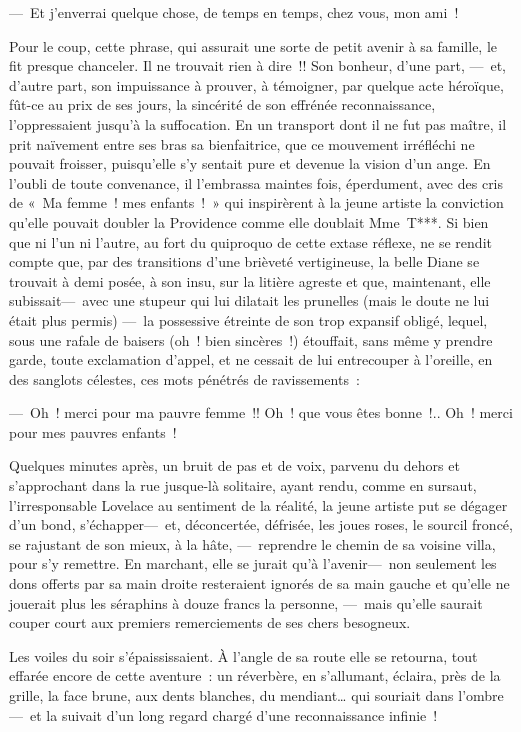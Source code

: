 \documentclass[french,twoside]{book} %
\begin{document}
— Et j’enverrai quelque chose, de temps en temps, chez vous, mon ami !\par
Pour le coup, cette phrase, qui assurait une sorte de petit avenir à sa famille, le fit presque chanceler. Il ne trouvait rien à dire !! Son bonheur, d’une part, — et, d’autre part, son impuissance   à prouver, à témoigner, par quelque acte héroïque, fût-ce au prix de ses jours, la sincérité de son effrénée reconnaissance, l’oppressaient jusqu’à la suffocation. En un transport dont il ne fut pas maître, il prit naïvement entre ses bras sa bienfaitrice, que ce mouvement irréfléchi ne pouvait froisser, puisqu’elle s’y sentait pure et devenue la vision d’un ange. En l’oubli de toute convenance, il l’embrassa maintes fois, éperdument, avec des cris de « Ma femme ! mes enfants ! » qui inspirèrent à la jeune artiste la conviction qu’elle pouvait doubler la Providence comme elle doublait Mme T***. Si bien que ni l’un ni l’autre, au fort du quiproquo de cette extase réflexe, ne se rendit compte que, par des transitions d’une brièveté vertigineuse, la belle Diane se trouvait à demi posée, à son insu, sur la litière agreste et que, maintenant, elle subissait— avec une stupeur qui lui dilatait les prunelles (mais le doute ne lui était plus permis) — la possessive étreinte de son trop expansif obligé, lequel, sous une rafale de baisers (oh ! bien sincères !) étouffait, sans même   y prendre garde, toute exclamation d’appel, et ne cessait de lui entrecouper à l’oreille, en des sanglots célestes, ces mots pénétrés de ravissements :\par
— Oh ! merci pour ma pauvre femme !! Oh ! que vous êtes bonne !.. Oh ! merci pour mes pauvres enfants !\par
Quelques minutes après, un bruit de pas et de voix, parvenu du dehors et s’approchant dans la rue jusque-là solitaire, ayant rendu, comme en sursaut, l’irresponsable Lovelace au sentiment de la réalité, la jeune artiste put se dégager d’un bond, s’échapper— et, déconcertée, défrisée, les joues roses, le sourcil froncé, se rajustant de son mieux, à la hâte, — reprendre le chemin de sa voisine villa, pour s’y remettre. En marchant, elle se jurait qu’à l’avenir— non seulement les dons offerts par sa main droite resteraient ignorés de sa main gauche et qu’elle ne jouerait plus les séraphins à douze francs la personne, — mais qu’elle saurait couper court aux premiers remerciements de ses chers besogneux.\par
   Les voiles du soir s’épaississaient. À l’angle de sa route elle se retourna, tout effarée encore de cette aventure : un réverbère, en s’allumant, éclaira, près de la grille, la face brune, aux dents blanches, du mendiant… qui souriait dans l’ombre— et la suivait d’un long regard chargé d’une reconnaissance infinie !
\end{document}
